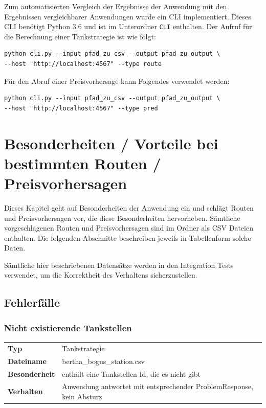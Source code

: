 \documentclass[
ngerman          %
,a4paper          %
,11pt
,pdftex
]{report}
\begin{document}
Zum automatisierten Vergleich der Ergebnisse der Anwendung mit den Ergebnissen vergleichbarer Anwendungen wurde ein \ac{CLI} implementiert. Dieses \ac{CLI} benötigt Python 3.6 und ist im Unterordner \texttt{CLI} enthalten. Der Aufruf für die Berechnung einer Tankstrategie ist wie folgt:

\begin{lstlisting}
python cli.py --input pfad_zu_csv --output pfad_zu_output \
--host "http://localhost:4567" --type route
\end{lstlisting}

Für den Abruf einer Preisvorhersage kann Folgendes verwendet werden:

\begin{lstlisting}
python cli.py --input pfad_zu_csv --output pfad_zu_output \
--host "http://localhost:4567" --type pred
\end{lstlisting}

\chapter{Besonderheiten / Vorteile bei bestimmten Routen / Preisvorhersagen}

Dieses Kapitel geht auf Besonderheiten der Anwendung ein und schlägt Routen und Preisvorhersagen vor, die diese Besonderheiten hervorheben. Sämtliche vorgeschlagenen Routen und Preisvorhersagen sind im Ordner  als \ac{CSV} Dateien enthalten. Die folgenden Abschnitte beschreiben jeweils in Tabellenform solche Daten.

Sämtliche hier beschriebenen Datensätze werden in den Integration Tests verwendet, um die Korrektheit des Verhaltens sicherzustellen.
\section{Fehlerfälle}
\subsection{Nicht existierende Tankstellen}

\begin{table}[H]
	\centering
	\begin{tabular}{l l}
    	\hline
		\textbf{Typ} & Tankstrategie \\ 
		\textbf{Dateiname} & bertha\_bogus\_station.csv \\
        \textbf{Besonderheit} & enthält eine Tankstellen Id, die es nicht gibt \\
        \textbf{Verhalten} & Anwendung antwortet mit entsprechender ProblemResponse, kein Absturz \\
		\hline 
	\end{tabular}
\end{table} 
\end{document}
